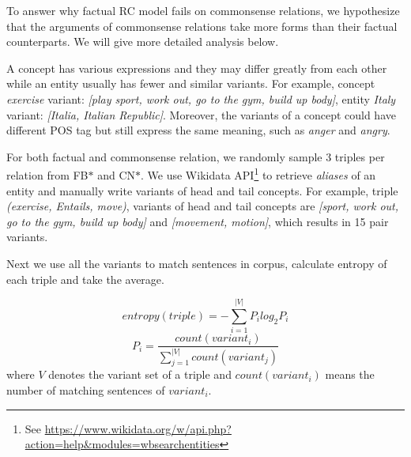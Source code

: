 To answer why factual RC model fails on 
commonsense relations, we hypothesize that 
the arguments of commonsense relations take more forms than their factual counterparts. We will give more detailed analysis below.

A concept has various expressions and they may differ greatly from each other while an entity usually has fewer and similar variants. 
For example, 
concept \textit{exercise} variant: \textit{[play sport, work out, go to the gym, build up body]}, entity \textit{Italy} variant: \textit{[Italia, Italian Republic]}. Moreover, the variants of a concept could have different POS tag but still express the same meaning, such as \textit{anger} and \textit{angry}. 


For both factual and commonsense relation, we randomly sample 3 
triples per relation from FB$*$ and CN$*$. We use Wikidata API\footnote{See \url{ https://www.wikidata.org/w/api.php?action=help&modules=wbsearchentities}} to retrieve \textit{aliases} of 
an entity and manually write variants of head and tail concepts. 
For example, triple \textit{(exercise, Entails, move)}, variants of head and 
tail concepts are \textit{[sport, work out, go to the gym, build up body]} 
and \textit{[movement, motion]}, which results in 15 pair variants. 


Next we use all the variants to match sentences in corpus, 
calculate entropy of each triple and take the average.

\[ entropy(triple) = -\sum_{i=1}^{|V|}P_{i}log_{2}P_{i} \]
\[ P_{i} = \frac{count(variant_{i})} {\sum_{j=1}^{|V|} count(variant_{j}) } \]
\noindent
where $V$ denotes the variant set of a triple and $count(variant_{i})$ means the number of matching sentences of $variant_{i}$.


